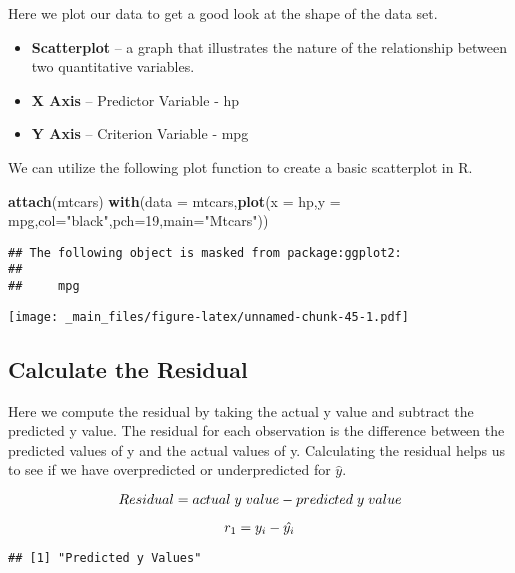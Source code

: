 \documentclass[
]{book}
\newenvironment{Shaded}{\begin{snugshade}}{\end{snugshade}}
\newcommand{\AttributeTok}[1]{\textcolor[rgb]{0.13,0.29,0.53}{#1}}
\newcommand{\DecValTok}[1]{\textcolor[rgb]{0.00,0.00,0.81}{#1}}
\newcommand{\FunctionTok}[1]{\textcolor[rgb]{0.13,0.29,0.53}{\textbf{#1}}}
\newcommand{\NormalTok}[1]{#1}
\newcommand{\StringTok}[1]{\textcolor[rgb]{0.31,0.60,0.02}{#1}}
\providecommand{\tightlist}{%
  \setlength{\itemsep}{0pt}\setlength{\parskip}{0pt}}
\theoremstyle{definition}
\theoremstyle{definition}
\theoremstyle{definition}
\theoremstyle{definition}
\theoremstyle{remark}
\begin{document}
Here we plot our data to get a good look at the shape of the data set.

\begin{itemize}
\tightlist
\item
  \textbf{Scatterplot} -- a graph that illustrates the nature of the relationship between two quantitative variables.
\item
  \textbf{X Axis} -- Predictor Variable - hp
\item
  \textbf{Y Axis} -- Criterion Variable - mpg
\end{itemize}

We can utilize the following plot function to create a basic scatterplot in R.

\begin{Shaded}
\begin{Highlighting}[]
\FunctionTok{attach}\NormalTok{(mtcars)}
\FunctionTok{with}\NormalTok{(}\AttributeTok{data =}\NormalTok{ mtcars,}\FunctionTok{plot}\NormalTok{(}\AttributeTok{x =}\NormalTok{ hp,}\AttributeTok{y =}\NormalTok{ mpg,}\AttributeTok{col=}\StringTok{"black"}\NormalTok{,}\AttributeTok{pch=}\DecValTok{19}\NormalTok{,}\AttributeTok{main=}\StringTok{"Mtcars"}\NormalTok{))}
\end{Highlighting}
\end{Shaded}

\begin{verbatim}
## The following object is masked from package:ggplot2:
## 
##     mpg
\end{verbatim}

\texttt{[image: \_main\_files/figure-latex/unnamed-chunk-45-1.pdf]}

\hypertarget{calculate-the-residual}{%
\subsection{Calculate the Residual}\label{calculate-the-residual}}

Here we compute the residual by taking the actual y value and subtract the predicted y value. The residual for each observation is the difference between the predicted values of y and the actual values of y. Calculating the residual helps us to see if we have overpredicted or underpredicted for \(\hat{y}\).

\[\Large
Residual = actual\;y\;value - predicted\;y\;value
\]

\[\Large
r_{1} = y_{i} - \hat{y_{i}}
\]

\begin{verbatim}
## [1] "Predicted y Values"
\end{verbatim}
\end{document}
